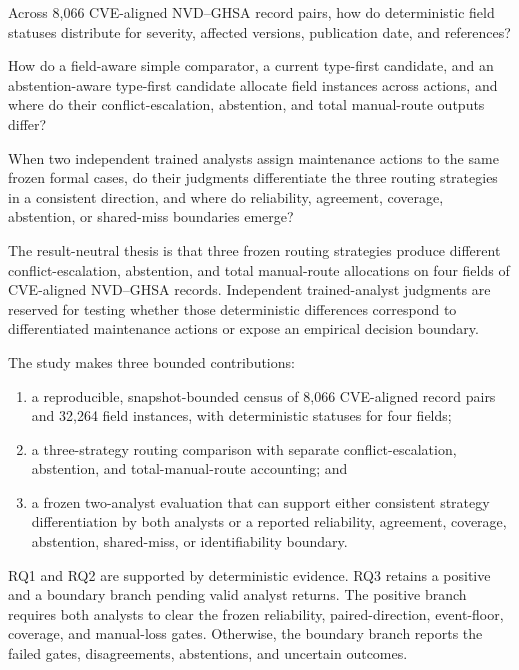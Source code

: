 \documentclass[preprint,review,12pt,authoryear]{elsarticle}
\begin{document}
\begin{description}[leftmargin=1.7cm,style=nextline]
\item[RQ1] Across 8,066 CVE-aligned NVD--GHSA record pairs, how do deterministic
field statuses distribute for severity, affected versions, publication date,
and references?
\item[RQ2] How do a field-aware simple comparator, a current type-first
candidate, and an abstention-aware type-first candidate allocate field
instances across actions, and where do their conflict-escalation, abstention,
and total manual-route outputs differ?
\item[RQ3] When two independent trained analysts assign maintenance actions to
the same frozen formal cases, do their judgments differentiate the three
routing strategies in a consistent direction, and where do reliability,
agreement, coverage, abstention, or shared-miss boundaries emerge?
\end{description}

The result-neutral thesis is that three frozen routing strategies produce
different conflict-escalation, abstention, and total manual-route allocations
on four fields of CVE-aligned NVD--GHSA records. Independent trained-analyst
judgments are reserved for testing whether those deterministic differences
correspond to differentiated maintenance actions or expose an empirical
decision boundary.

The study makes three bounded contributions:

\begin{enumerate}
\item a reproducible, snapshot-bounded census of 8,066 CVE-aligned record pairs
and 32,264 field instances, with deterministic statuses for four fields;
\item a three-strategy routing comparison with separate conflict-escalation,
abstention, and total-manual-route accounting; and
\item a frozen two-analyst evaluation that can support either consistent
strategy differentiation by both analysts or a reported reliability,
agreement, coverage, abstention, shared-miss, or identifiability boundary.
\end{enumerate}

RQ1 and RQ2 are supported by deterministic evidence. RQ3 retains a positive and
a boundary branch pending valid analyst returns. The positive branch requires
both analysts to clear the frozen reliability, paired-direction, event-floor,
coverage, and manual-loss gates. Otherwise, the boundary branch reports the
failed gates, disagreements, abstentions, and uncertain outcomes.
\end{document}
